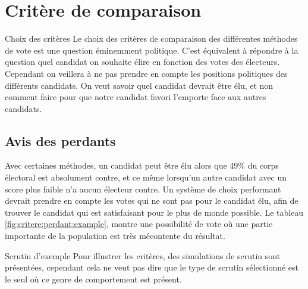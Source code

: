 \documentclass[../report]{subfiles}
\begin{document}
  
  \chapter{Critère de comparaison}
  
  \begin{important}{Choix des critères}
  	Le choix des critères de comparaison des différentes méthodes de vote est une question 
  	éminemment politique.
  	C'est équivalent à répondre à la question quel candidat on souhaite élire en fonction
  	des votes des électeurs. Cependant on veillera à ne pas prendre en compte les positions 
  	politiques des différents candidats.
  	On veut savoir quel candidat devrait être élu, et non comment faire pour que notre candidat 
  	favori l'emporte face aux autres candidats.
  \end{important}


  \section{Avis des perdants}

  Avec certaines méthodes, un candidat peut être élu alors que 49\% du corps électoral est
  absolument contre, et ce même lorsqu'un autre candidat avec un score plus faible n'a aucun
  électeur contre.
  Un système de choix performant devrait prendre en compte les votes qui ne sont pas pour le candidat
  élu, afin de trouver le candidat qui est satisfaisant pour le plus de monde possible.
  Le tableau \ref{fig:critere:perdant:example}, montre une possibilité de vote où une partie importante de la population
  est très mécontente du résultat.

  \begin{nota}{Scrutin d'exemple}
	Pour illustrer les critères, des simulations de scrutin sont présentées, cependant cela ne 
	veut pas dire que le type de scrutin sélectionné est le seul où ce genre de comportement 
	est présent.
  \end{nota}

	\begin{table}[h]
		\begin{center}
			\caption{Exemple de cas où une grande partie de la population est mécontente}%
			\label{fig:critere:perdant:example}%
		\end{center}
	\end{table}
  
\end{document}
